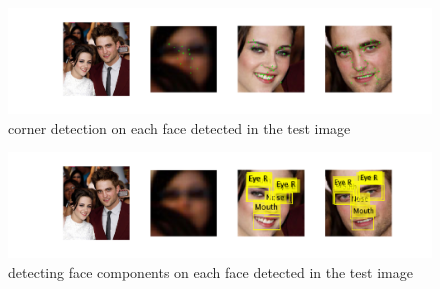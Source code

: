 \documentclass[10pt, twocolumn]{article}
\begin{document}
\begin{figure}[h!]
\centering
\includegraphics[width=0.7\linewidth]{figures/corner_detection.png}
\caption{corner detection on each face detected in the test image}
\end{figure}

\begin{figure}[h!]
\centering
\includegraphics[width=0.7\linewidth]{figures/component_detection.png}
\caption{detecting face components on each face detected in the test image}
\end{figure}
\end{document}
